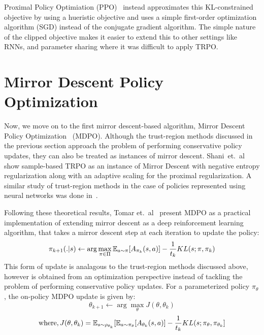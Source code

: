 Proximal Policy Optimiation (PPO)~\cite{schulmanProximal2017} instead approximates this
KL-constrained objective by using a hueristic objective and uses a simple first-order optimization
algorithm (SGD) instead of the conjugate gradient algorithm.
The simple nature of the clipped objective makes it easier to extend this to other settings like
RNNs, and parameter sharing where it was difficult to apply TRPO.

\section[MDPO]{Mirror Descent Policy Optimization}
Now, we move on to the first mirror descent-based algorithm, Mirror Descent Policy
Optimization~\cite{tomarMirror2022} (MDPO).
Although the trust-region methods discussed in the previous section approach the problem of
performing conservative policy updates, they can also be treated as instances of mirror descent.
Shani~et.~al~\cite{shaniAdaptive2020} show sample-based TRPO as an instance of Mirror Descent with
negative entropy regularization along with an adaptive scaling for the proximal regularization.
A similar study of trust-region methods in the case of policies represented using neural networks
was done in~\cite{liuNeural2019}.

Following these theoretical results, Tomar et.~al~\cite{tomarMirror2022} present MDPO as a
practical implementation of extending mirror descent as a deep reinforcement learning algorithm,
that takes a mirror descent step at each iteration to update the policy:
\begin{equation}
	\label{eqn:mdrl} \pi_{k+1}(.
	|s) \leftarrow \arg
	\max_{\pi \in \Pi}
	\mathbb{E}_{a \sim \pi} [A_{\pi_k}(s,a)] -
	\frac{1}{t_k}
	KL(s; \pi, \pi_k)
\end{equation} This form of update is analagous to the trust-region methods
discussed above, however is obtained from an optimization perspective instead of tackling the
problem of performing conservative policy updates.
For a parameterized policy $\pi_{\theta}$, the on-policy MDPO update is given by: $$ \theta_{k+1}
	\leftarrow \arg \max_{\theta} J(\theta, \theta_k)$$ $$ \text{where}, J(\theta, \theta_k) = \mathbb{E}_{s
		\sim \rho_{\theta_k}} [ \mathbb{E}_{a \sim \pi_\theta}[A_{\theta_k}(s,a)] - \frac{1}{t_k} KL(s; \pi_\theta,
		\pi_{\theta_k}]$$

